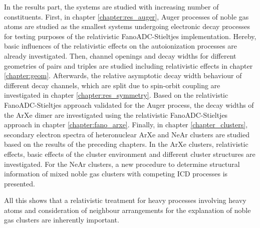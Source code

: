 In the results part, the systems are studied with increasing number of constituents.
First, in chapter \ref{chapter:res_auger}, Auger processes of noble gas
atoms are studied as the smallest systems undergoing electronic decay
processes for testing purposes
of the relativistic FanoADC-Stieltjes implementation. Hereby, basic influences
of the relativistic effects on the autoionization processes are already
investigated.
Then, channel openings and decay widths for
different geometries of pairs and triples are studied including relativistic
effects in chapter \ref{chapter:geom}. Afterwards, the relative asymptotic
decay width behaviour
of different decay channels, which are split due to spin-orbit coupling are
investigated in chapter \ref{chapter:res_symmetry}.
Based on the relativistic FanoADC-Stieltjes approach validated for the
Auger process, the decay widths of the ArXe dimer are
investigated using the relativistic FanoADC-Stieltjes approach in chapter
\ref{chapter:fano_arxe}. Finally, in chapter \ref{chapter_clusters},
secondary electron
spectra of heteronuclear ArXe and NeAr clusters are studied based on the
results of the preceding chapters.
In the ArXe clusters, relativistic effects, basic effects of the cluster environment
and different cluster structures are investigated.
For the NeAr clusters, a new procedure to determine structural information of mixed
noble gas clusters with competing \ac{ICD} processes is presented.

All this shows that a relativistic treatment for heavy processes involving
heavy atoms and consideration of neighbour arrangements for the explanation
of noble gas clusters are inherently important.
